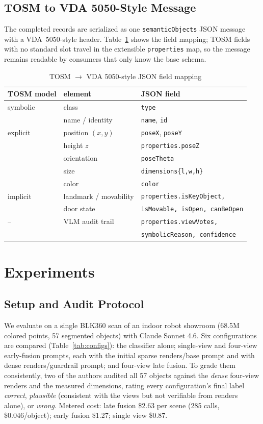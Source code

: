 \documentclass[conference]{IEEEtran}
\begin{document}
\subsection{TOSM to VDA 5050-Style Message}
The completed records are serialized as one \texttt{semanticObjects} JSON
message with a VDA~5050-style header. Table~\ref{tab:mapping} shows the
field mapping; TOSM fields with no standard slot travel in the extensible
\texttt{properties} map, so the message remains readable by consumers that
only know the base schema.

\begin{table}[t]
\caption{TOSM $\rightarrow$ VDA 5050-style JSON field mapping}
\label{tab:mapping}
\centering
\scriptsize
\begin{tabular}{@{}lll@{}}
\toprule
TOSM model & element & JSON field \\
\midrule
symbolic & class & \texttt{type} \\
         & name / identity & \texttt{name}, \texttt{id} \\
explicit & position $(x,y)$ & \texttt{poseX}, \texttt{poseY} \\
         & height $z$ & \texttt{properties.poseZ} \\
         & orientation & \texttt{poseTheta} \\
         & size & \texttt{dimensions\{l,w,h\}} \\
         & color & \texttt{color} \\
implicit & landmark / movability & \texttt{properties.isKeyObject,} \\
         & door state & \texttt{isMovable, isOpen, canBeOpen} \\
--       & VLM audit trail & \texttt{properties.viewVotes,} \\
         &                 & \texttt{symbolicReason, confidence} \\
\bottomrule
\end{tabular}
\end{table}

\section{Experiments}

\subsection{Setup and Audit Protocol}
We evaluate on a single BLK360 scan of an indoor robot showroom (68.5M
colored points, 57 segmented objects) with Claude Sonnet 4.6. Six
configurations are compared (Table~\ref{tab:configs}): the classifier
alone; single-view and four-view early-fusion prompts, each with the
initial sparse renders/base prompt and with dense renders/guardrail prompt;
and four-view late fusion. To grade them consistently, two of the authors
audited all 57 objects against the \emph{dense} four-view renders and the
measured dimensions, rating every configuration's final label
\emph{correct}, \emph{plausible} (consistent with the views but not
verifiable from renders alone), or \emph{wrong}. Metered cost: late fusion
\$2.63 per scene (285 calls, \$0.046/object); early fusion \$1.27; single
view \$0.87.
\end{document}
